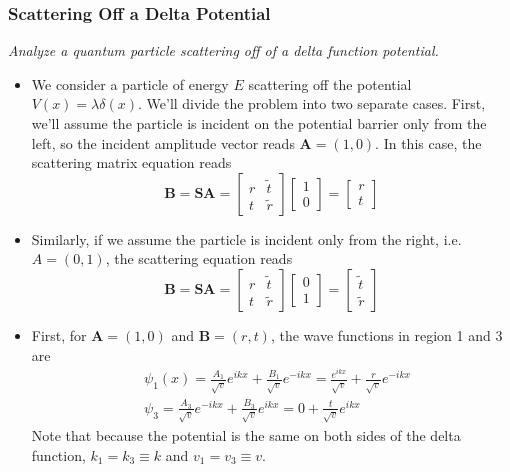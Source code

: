 \documentclass[11pt, a4paper]{article}
\renewcommand{\vec}[1]{\bm{#1}} %
\newcommand{\mat}[1]{\mathbf{#1}} %
\begin{document}
\subsubsection{Scattering Off a Delta Potential}
\textit{Analyze a quantum particle scattering off of a delta function potential.}
\begin{itemize}	
 	\item We consider a particle of energy $ E $ scattering off the potential $ V(x) = \lambda \delta(x) $. We'll divide the problem into two separate cases. First, we'll assume the particle is incident on the potential barrier only from the left, so the incident amplitude vector reads $ \vec{A} = (1, 0) $. In this case, the scattering matrix equation reads
	\begin{equation*}
		\vec{B} = \mat{S} \vec{A} = 
		\begin{bmatrix}
			r & \tilde{t}\\
			t & \tilde{r}
		\end{bmatrix}
		\begin{bmatrix}
			1\\
			0
		\end{bmatrix}
		= 
		\begin{bmatrix}
			r\\
			t
		\end{bmatrix}
	\end{equation*}
	
	\item Similarly, if we assume the particle is incident only from the right, i.e. $ A = (0, 1) $,  the scattering equation reads
	\begin{equation*}
		\vec{B} = \mat{S} \vec{A} = 
		\begin{bmatrix}
			r & \tilde{t}\\
			t & \tilde{r}
		\end{bmatrix}
		\begin{bmatrix}
			0\\
			1
		\end{bmatrix}
		= 
		\begin{bmatrix}
			\tilde{t}\\
			\tilde{r}
		\end{bmatrix}
	\end{equation*}
		
	\item First, for $ \vec{A} = (1, 0) $ and $ \vec{B} = (r, t) $, the wave functions in region 1 and 3 are
	\begin{align*}
		&\psi_{1}(x) = \frac{A_{1}}{\sqrt{v}}e^{ikx} + \frac{B_{1}}{\sqrt{v}} e^{-ikx} = \frac{e^{ikx}}{\sqrt{v}} + \frac{r}{\sqrt{v}} e^{-ikx}\\
		& \psi_{3} = \frac{A_{3}}{\sqrt{v}} e^{-ikx} + \frac{B_{3}}{\sqrt{v}} e^{ikx} = 0 +  \frac{t}{\sqrt{v}} e^{ikx}
	\end{align*}
	Note that because the potential is the same on both sides of the delta function, $ k_{1} = k_{3} \equiv k$ and $ v_{1} = v_{3} \equiv v $.
	

\end{itemize}
\end{document}
